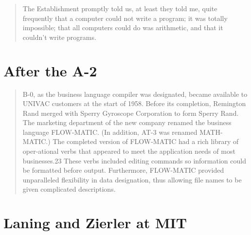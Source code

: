 \begin{quotation}
The Establishment promptly told us, at least they told me, quite frequently that a
computer could not write a program; it was totally impossible; that all computers
could do was arithmetic, and that it couldn't write programs.\cite{hopl_keynote}
\end{quotation}


\section{After the A-2}


\begin{quotation}
B-0, as the business language compiler was designated, became available to 
UNIVAC customers at the start of 1958. Before its completion, Remington Rand 
merged with Sperry Gyroscope Corporation to form Sperry Rand. The marketing 
department of the new company renamed the business language FLOW-MATIC. (In 
addition, AT-3 was renamed MATH-MATIC.) The completed version of FLOW-MATIC had 
a rich library of oper-ational verbs that appeared to meet the application 
needs of most businesses.23 These verbs included editing commands so 
information could be formatted before output. Furthermore, FLOW-MATIC provided 
unparalleled flexibility in data designation, thus allowing file names to be 
given complicated descriptions.
\end{quotation}

\section{Laning and Zierler at MIT}

